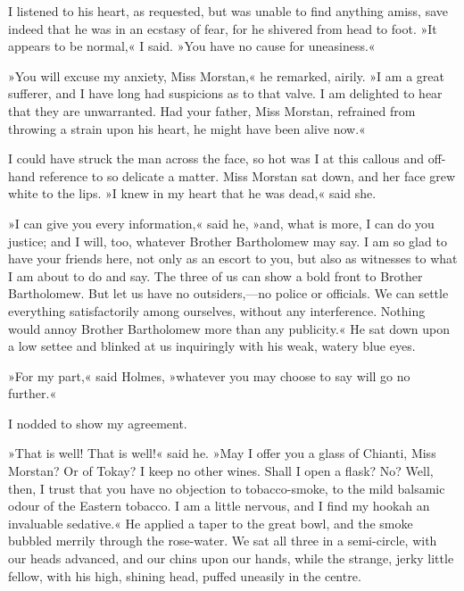 I listened to his heart, as requested, but was unable to find anything amiss, save indeed that he was in an ecstasy of fear, for he shivered from head to foot. »It appears to be normal,« I said. »You have no cause for uneasiness.«

»You will excuse my anxiety, Miss Morstan,« he remarked, airily. »I am a great sufferer, and I have long had suspicions as to that valve. I am delighted to hear that they are unwarranted. Had your father, Miss Morstan, refrained from throwing a strain upon his heart, he might have been alive now.«

I could have struck the man across the face, so hot was I at this callous and off-hand reference to so delicate a matter. Miss Morstan sat down, and her face grew white to the lips. »I knew in my heart that he was dead,« said she.

»I can give you every information,« said he, »and, what is more, I can do you justice; and I will, too, whatever Brother Bartholomew may say. I am so glad to have your friends here, not only as an escort to you, but also as witnesses to what I am about to do and say. The three of us can show a bold front to Brother Bartholomew. But let us have no outsiders,—no police or officials. We can settle everything satisfactorily among ourselves, without any interference. Nothing would annoy Brother Bartholomew more than any publicity.« He sat down upon a low settee and blinked at us inquiringly with his weak, watery blue eyes.

»For my part,« said Holmes, »whatever you may choose to say will go no further.«

I nodded to show my agreement.

»That is well! That is well!« said he. »May I offer you a glass of Chianti, Miss Morstan? Or of Tokay? I keep no other wines. Shall I open a flask? No? Well, then, I trust that you have no objection to tobacco-smoke, to the mild balsamic odour of the Eastern tobacco. I am a little nervous, and I find my hookah an invaluable sedative.« He applied a taper to the great bowl, and the smoke bubbled merrily through the rose-water. We sat all three in a semi-circle, with our heads advanced, and our chins upon our hands, while the strange, jerky little fellow, with his high, shining head, puffed uneasily in the centre.

